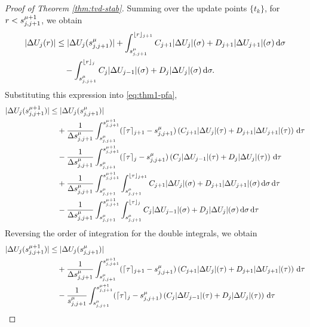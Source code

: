 \begin{proof}[Proof of Theorem \ref{thm:tvd-stab}]
Summing over the update points $\{t_k\}$, for $r < s^{\mu+1}_{j,j+1}$, we obtain
\begin{align*}
|\Delta U_j(r)| &\le |\Delta U_j(s^{\mu}_{j,j+1})| + \int_{ s^{\mu}_{j,j+1} }^{\lfloor r \rfloor_{j+1}} C_{j+1} |\Delta U_j|(\sigma) + D_{j+1} |\Delta U_{j+1}|(\sigma) \,\mathrm{d} \sigma \\
&\quad - \int_{ s^{\mu}_{j,j+1} }^{\lfloor r \rfloor_{j}} C_{j} |\Delta U_{j-1}|(\sigma) + D_{j} |\Delta U_{j}|(\sigma) \,\mathrm{d} \sigma.
\end{align*}
Substituting this expression into \eqref{eq:thm1-pfa},
\begin{align*}
|\Delta U_j ( s^{\mu+1}_{j,j+1})| & \le | \Delta U_j(s^{\mu}_{j,j+1})|\\
& \quad + \frac{1}{\Delta s^{\mu}_{j,j+1}} \int_{s^{\mu}_{j,j+1}}^{s^{\mu+1}_{j,j+1}} ( \lceil \tau \rceil_{j+1} - s^{\mu}_{j,j+1} ) \left( C_{j+1} |\Delta U_j|(\tau) + D_{j+1} | \Delta U_{j+1}| (\tau) \right) \,\mathrm{d} \tau\\
& \quad - \frac{1}{\Delta s^{\mu}_{j,j+1}} \int_{s^{\mu}_{j,j+1}}^{s^{\mu+1}_{j,j+1}} ( \lceil \tau \rceil_{j} - s^{\mu}_{j,j+1} ) \left( C_{j} |\Delta U_{j-1}|(\tau) + D_{j} | \Delta U_{j}| (\tau) \right) \,\mathrm{d} \tau\\
& \quad + \frac{1}{\Delta s^{\mu}_{j,j+1}} \int_{s^{\mu}_{j,j+1}}^{s^{\mu+1}_{j,j+1}} \int_{s^{\mu}_{j,j+1}}^{\lfloor \tau \rfloor_{j+1}}C_{j+1} |\Delta U_j|(\sigma) + D_{j+1} | \Delta U_{j+1}| (\sigma)\,\mathrm{d} \sigma \,\mathrm{d} \tau\\
& \quad - \frac{1}{\Delta s^{\mu}_{j,j+1}} \int_{s^{\mu}_{j,j+1}}^{s^{\mu+1}_{j,j+1}}\int_{s^{\mu}_{j,j+1}}^{\lfloor \tau \rfloor_{j}} C_{j} |\Delta U_{j-1}|(\sigma) + D_{j} | \Delta U_{j}| (\sigma) \,\mathrm{d} \sigma\,\mathrm{d} \tau\\
\end{align*}
Reversing the order of integration for the double integrals, we obtain
\begin{align*}
|\Delta U_j (\ssyncnext)| & \le | \Delta U_j(\ssync)|\\
& \quad + \frac{1}{\Delta \ssync} \int_{\ssync}^{\ssyncnext} ( \lceil \tau \rceil_{j+1} - \ssync ) \left( C_{j+1} |\Delta U_j|(\tau) + D_{j+1} | \Delta U_{j+1}| (\tau) \right) \,\mathrm{d} \tau\\
& \quad - \frac{1}{\ssync} \int_{\ssync}^{\ssyncnext} ( \lceil \tau \rceil_{j} - \ssync ) \left( C_{j} |\Delta U_{j-1}|(\tau) + D_{j} | \Delta U_{j}| (\tau) \right) \,\mathrm{d} \tau\\

\end{align*}
\end{proof}
